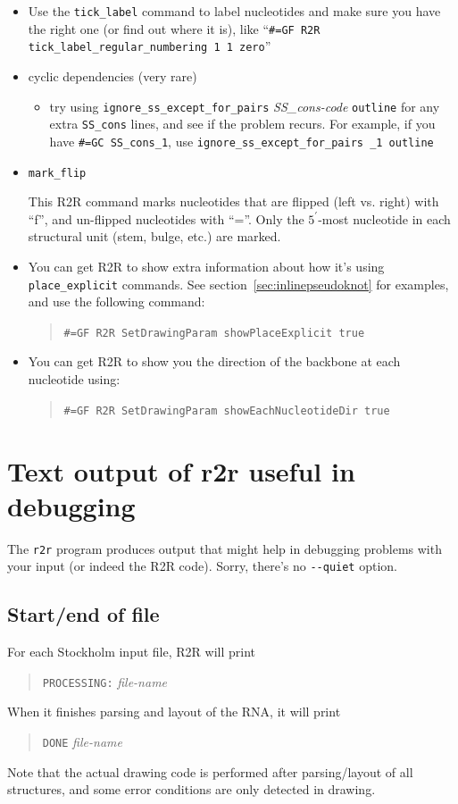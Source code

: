 \documentclass[letterpaper,12pt]{report}
\newcommand{\example}[1]{
\begin{quote}
{\raggedright
#1
}
\end{quote}
}
\newcommand{\examplett}[1]{
\example{{\tt #1}}
}
\begin{document}
\begin{itemize}
\item Use the {\tt tick\_label} command to label nucleotides and make sure you
have the right one (or find out where it is), like
{\textquotedblleft}{\tt \#=GF R2R tick\_label\_regular\_numbering 1 1
zero}{\textquotedblright}
\item cyclic dependencies (very rare)

\begin{itemize}
\item try using {\tt ignore\_ss\_except\_for\_pairs} {\it SS\_cons-code} {\tt outline} for any
extra {\tt SS\_cons} lines, and see if the problem recurs.  For example, if you have {\tt \#=GC SS\_cons\_1}, use
{\tt ignore\_ss\_except\_for\_pairs \_1 outline}
\end{itemize}

\item
{\tt mark\_flip}

This R2R command marks nucleotides that are flipped (left vs. right) with ``f'', and un-flipped nucleotides with ``=''.
Only the $5^\prime$-most nucleotide in each structural unit (stem, bulge, etc.) are marked.

\item You can get R2R to show extra information about how it's using {\tt place\_explicit} commands.
See section~\ref{sec:inlinepseudoknot} for examples, and use the following command:
\examplett{\#=GF R2R SetDrawingParam showPlaceExplicit true}

\item You can get R2R to show you the direction of the backbone at each nucleotide using:
\examplett{\#=GF R2R SetDrawingParam showEachNucleotideDir true}

\end{itemize}

\section{Text output of r2r useful in debugging}

The {\tt r2r} program produces output that might help in debugging problems with your input (or indeed
the R2R code).  Sorry, there's no {\tt -{}-quiet} option.

\subsection{Start/end of file}

For each Stockholm input file, R2R will print
\example{
{\tt PROCESSING:} {\it file-name}
}
When it finishes parsing and layout of the RNA, it will print
\example{
{\tt DONE} {\it file-name}
}
Note that the actual drawing code is performed after parsing/layout of
all structures, and some error conditions are only detected in drawing.
\end{document}
